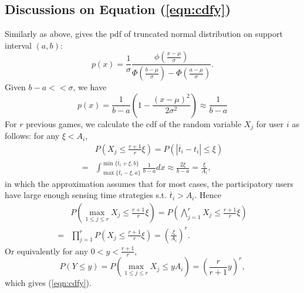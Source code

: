 \documentclass{IEEEtran}
\begin{document}
\subsection{Discussions on Equation (\ref{eqn:cdfy})}
\label{sec:dcdfy}
Similarly as above, \cite{burkardt2014truncated} gives the pdf of truncated normal distribution on support interval $(a,b)$:
\begin{equation}
p(x) = \frac{1}{\sigma}\frac{\phi(\frac{x-\mu}{\sigma})}{\Phi(\frac{b-\mu}{\sigma}) - \Phi(\frac{a-\mu}{\sigma})}.
\end{equation}
Given $b-a << \sigma$, we have
\begin{equation}
p(x) = \frac{1}{b-a}\left( 1-\frac{(x-\mu)^2}{2\sigma^2} \right) \approx \frac{1}{b-a}
\end{equation}
For $r$ previous games, we calculate the cdf of the random variable $X_j$ for user $i$ as follows: for any $\xi < A_i$,
\begin{equation}
\label{eqn:xj}
\begin{aligned}
&P(X_j \leq \frac{r+1}{r}\xi) = P(|\overline{t}_i - t_i|\leq \xi)\\
= &\int_{\max\{\overline{t}_i-\xi, a\}}^{\min\{\overline{t}_i+\xi, b\}} \frac{1}{b-a} dx \approx \frac{2\xi}{b-a} = \frac{\xi}{A_i},
\end{aligned}
\end{equation}
in which the approximation assumes that for most cases, the participatory users have large enough sensing time strategies s.t. $\overline{t}_i>A_i$. Hence
\begin{equation}
\begin{aligned}
&P(\max_{1\leq j \leq r}X_j \leq \frac{r+1}{r}\xi) = P(\bigwedge_{j=1}^r X_j \leq \frac{r+1}{r}\xi) \\
= &\prod_{j=1}^r P(X_j \leq \frac{r+1}{r}\xi) = \left(\frac{\xi}{A_i}\right)^r.
\end{aligned}
\end{equation}
Or equivalently for any $0<y<\frac{r+1}{r}$,
\begin{equation}
P(Y \leq y) = P(\max_{1\leq j \leq r}X_j \leq y A_i) = \left(\frac{r}{r+1}y\right)^r,
\end{equation}
which gives (\ref{eqn:cdfy}).
\end{document}
